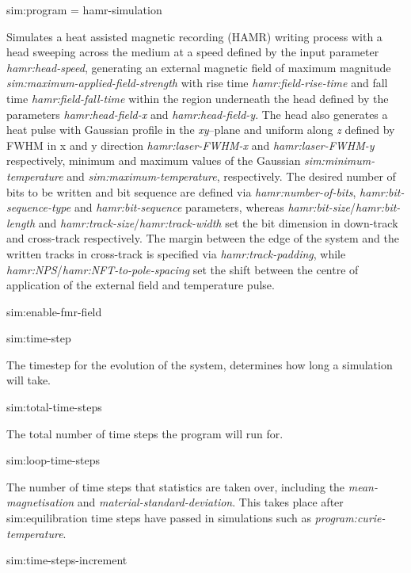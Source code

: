 {\zicf sim:program = hamr-simulation}
Simulates a heat assisted magnetic recording (HAMR) writing process with a head sweeping across the medium at a speed
defined by the input parameter \textit{hamr:head-speed}, generating an external magnetic field of maximum magnitude
\textit{sim:maximum-applied-field-strength} with rise time \textit{hamr:field-rise-time} and fall time \textit{hamr:field-fall-time}
within the region underneath the head defined by the parameters \textit{hamr:head-field-x} and \textit{hamr:head-field-y}.
The head also generates a heat pulse with Gaussian profile in the \textit{xy}--plane and uniform along \textit{z}
defined by FWHM in x and y direction \textit{hamr:laser-FWHM-x} and \textit{hamr:laser-FWHM-y} respectively,
minimum and maximum values of the Gaussian \textit{sim:minimum-temperature} and \textit{sim:maximum-temperature}, respectively.
The desired number of bits to be written and bit sequence are defined via
\textit{hamr:number-of-bits}, \textit{hamr:bit-sequence-type} and \textit{hamr:bit-sequence} parameters, whereas
\textit{hamr:bit-size}/\textit{hamr:bit-length} and \textit{hamr:track-size}/\textit{hamr:track-width} set the bit
dimension in down-track and cross-track respectively.
The margin between the edge of the system and the written tracks in cross-track is specified via
\textit{hamr:track-padding}, while \textit{hamr:NPS}/\textit{hamr:NFT-to-pole-spacing}
set the shift between the centre of application of the external field and temperature pulse.

{\zicf sim:enable-fmr-field}

{\zicf sim:time-step} The timestep for the evolution of the system, determines how long a simulation will take.

{\zicf sim:total-time-steps} The total number of time steps the program will run for.

{\zicf sim:loop-time-steps} The number of time steps that statistics are taken over, including the \textit{mean-magnetisation} and \textit{material-standard-deviation}. This takes place after sim:equilibration time steps have passed in simulations such as \textit{program:curie-temperature}.

{\zicf sim:time-steps-increment}

